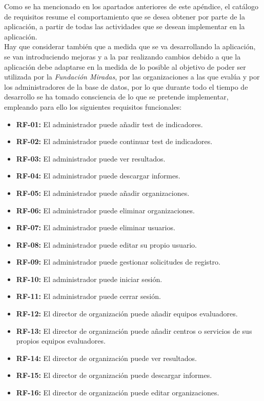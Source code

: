 Como se ha mencionado en los apartados anteriores de este apéndice, el catálogo
de requisitos resume el comportamiento que se desea obtener por parte de la
aplicación, a partir de todas las actividades que se desean implementar en la
aplicación.
\\
Hay que considerar también que a medida que se va desarrollando la aplicación,
se van introduciendo mejoras y a la par realizando cambios debido a que la
aplicación debe adaptarse en la medida de lo posible al objetivo de poder ser
utilizada por la \textit{Fundación Miradas}, por las organizaciones a las que
evalúa y por los administradores de la base de datos, por lo que durante todo el
tiempo de desarrollo se ha tomado consciencia de lo que se pretende implementar,
empleando para ello los siguientes requisitos funcionales:
\begin{itemize}
	\item \textbf{RF-01:} El administrador puede añadir test de indicadores.
	\item \textbf{RF-02:} El administrador puede continuar test de indicadores.
	\item \textbf{RF-03:} El administrador puede ver resultados.
	\item \textbf{RF-04:} El administrador puede descargar informes.
	\item \textbf{RF-05:} El administrador puede añadir organizaciones.
	\item \textbf{RF-06:} El administrador puede eliminar organizaciones.
	\item \textbf{RF-07:} El administrador puede eliminar usuarios.
	\item \textbf{RF-08:} El administrador puede editar su propio usuario.
	\item \textbf{RF-09:} El administrador puede gestionar solicitudes de registro.
	\item \textbf{RF-10:} El administrador puede iniciar sesión.
	\item \textbf{RF-11:} El administrador puede cerrar sesión.
	\item \textbf{RF-12:} El director de organización puede añadir equipos evaluadores.
	\item \textbf{RF-13:} El director de organización puede añadir centros o servicios de sus propios equipos evaluadores.
	\item \textbf{RF-14:} El director de organización puede ver resultados.
	\item \textbf{RF-15:} El director de organización puede descargar informes.
	\item \textbf{RF-16:} El director de organización puede editar organizaciones.

\end{itemize}
